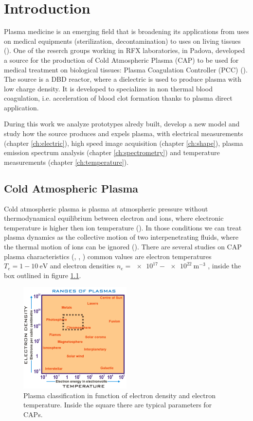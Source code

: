 \chapter{Introduction}
\label{ch:intro}
Plasma medicine is an emerging field that is broadening its applications from uses on medical equipments (sterilization, decontamination) to uses on living tissues (\cite{plmed_review}). One of the reserch groups working in RFX laboratories, in Padova, developed a source for the production of Cold Atmospheric Plasma (CAP) to be used for medical treatment on biological tissues: Plasma Coagulation Controller (PCC) (\cite{DeMasi_2018}). The source is a DBD reactor, where a dielectric is used to produce plasma with low charge density. It is developed to specializes in non thermal blood coagulation, i.e. acceleration of blood clot formation thanks to plasma direct application.

During this work we analyze prototypes alredy built, develop a new model and study how the source produces and expels plasma, with electrical measurements (chapter \ref{ch:electric}), high speed image acquisition (chapter \ref{ch:shape}), plasma emission spectrum analysis (chapter \ref{ch:spectrometry}) and temperature measurements (chapter \ref{ch:temperature}).


\section{Cold Atmospheric Plasma}
Cold atmospheric plasma is plasma at atmospheric pressure without thermodynamical equilibrium between electron and ions, where electronic temperature is higher then ion temperature (\cite{VONENGEL196599}). In those conditions we can treat plasma dynamics as the collective motion of two interpenetrating fluids, where the thermal motion of ions can be ignored (\cite{goossens2012introduction}).
There are several studies on CAP plasma characteristics (\cite{Zhu_2009}, \cite{Ohyama_2009}, \cite{Amorim_2015}) common values are electron temperatures $T_e = 1 - \SI{10}{\electronvolt}$ and electron densities $n_e = \num{e17} - \SI{e22}{\meter^{-3}}$ , inside the box outlined in figure \ref{fig:plasmaclass}. 
\begin{figure}
 \centering
 \includegraphics[width=0.5\textwidth]{Images/Intro/Plasma_classification2.png}
 \caption{Plasma classification in function of electron density and electron temperature. Inside the square there are typical parameters for CAPs.}
 \label{fig:plasmaclass}
\end{figure}


